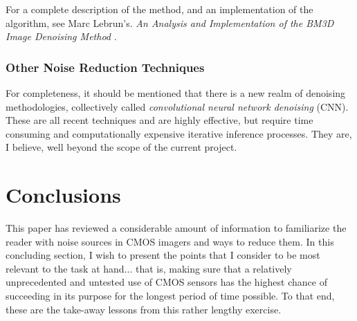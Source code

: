 \documentclass[10pt]{article}
\begin{document}
For a complete description of the method, and an implementation of the algorithm, see Marc Lebrun's. \emph{An Analysis and Implementation of the BM3D Image Denoising Method} \cite{lebrun12}. 

\subsubsection{Other Noise Reduction Techniques}

For completeness, it should be mentioned that there is a new realm of denoising methodologies, collectively called \emph{convolutional neural network denoising} (CNN). These are all recent techniques and are highly effective, but require time consuming and computationally expensive iterative inference processes. They are, I believe, well beyond the scope of the current project.

\section{Conclusions}

This paper has reviewed a considerable amount of information to familiarize the reader with noise sources in CMOS imagers and ways to reduce them. In this concluding section, I wish to present the points that I consider to be most relevant to the task at hand... that is, making sure that a relatively unprecedented and untested use of CMOS sensors has the highest chance of succeeding in its purpose for the longest period of time possible. To that end, these are the take-away lessons from this rather lengthy exercise.
\end{document}
